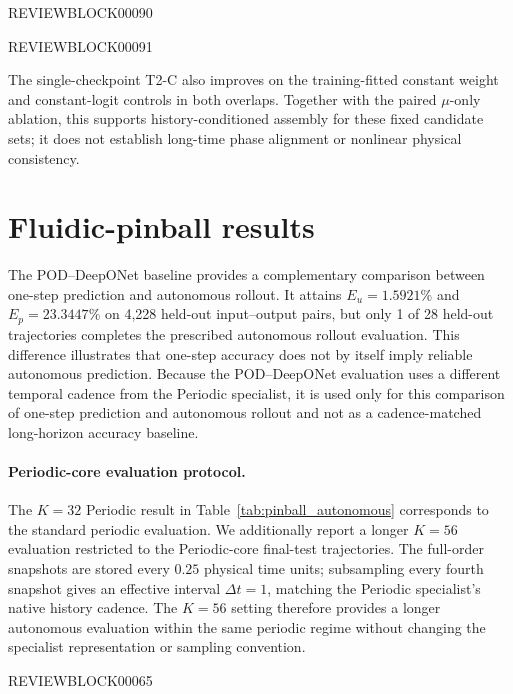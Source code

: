 \documentclass{article}
\begin{document}
REVIEWBLOCK00090





REVIEWBLOCK00091



The single-checkpoint T2-C also improves on the training-fitted constant
weight and constant-logit controls in both overlaps. Together with the
paired $\mu$-only ablation, this supports history-conditioned assembly
for these fixed candidate sets; it does not establish long-time phase
alignment or nonlinear physical consistency.

\FloatBarrier
\section{Fluidic-pinball results}
\label{app:pinball}

The POD--DeepONet baseline provides a complementary comparison between
one-step prediction and autonomous rollout. It attains $E_u=1.5921\%$ and $E_p=23.3447\%$ on 4,228 held-out input--output pairs, but only 1 of 28 held-out trajectories completes the prescribed autonomous rollout evaluation. This difference illustrates that one-step accuracy does not by itself imply reliable autonomous prediction. Because the POD--DeepONet evaluation uses a different temporal cadence from
the Periodic specialist, it is used only for this comparison of one-step prediction and autonomous rollout and not as a cadence-matched long-horizon accuracy baseline.

\paragraph{Periodic-core evaluation protocol.}
The $K=32$ Periodic result in Table~\ref{tab:pinball_autonomous} corresponds to the standard periodic evaluation. We additionally report a longer $K=56$ evaluation restricted to the Periodic-core final-test trajectories. The full-order snapshots are stored every $0.25$ physical time units; subsampling every fourth snapshot gives an effective interval $\Delta t=1$, matching the Periodic specialist's native history cadence. The $K=56$ setting therefore provides a longer autonomous evaluation within the same periodic regime without changing the specialist representation or
sampling convention.

\par


REVIEWBLOCK00065


\par
\end{document}
